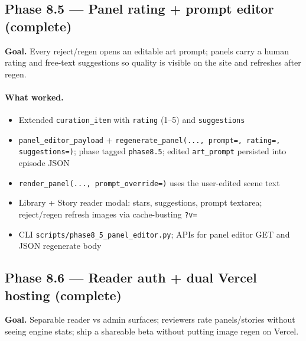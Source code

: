 \documentclass[10pt,twocolumn,letterpaper]{article}
\begin{document}
\subsection{Phase 8.5 --- Panel rating + prompt editor (complete)}
\textbf{Goal.} Every reject/regen opens an editable art prompt; panels carry a human rating and free-text suggestions so quality is visible on the site and refreshes after regen.

\paragraph{What worked.}
\begin{itemize}[leftmargin=*,itemsep=1pt]
  \item Extended \texttt{curation\_item} with \texttt{rating} (1--5) and \texttt{suggestions}
  \item \texttt{panel\_editor\_payload} + \texttt{regenerate\_panel(..., prompt=, rating=, suggestions=)}; phase tagged \texttt{phase8.5}; edited \texttt{art\_prompt} persisted into episode JSON
  \item \texttt{render\_panel(..., prompt\_override=)} uses the user-edited scene text
  \item Library + Story reader modal: stars, suggestions, prompt textarea; reject/regen refresh images via cache-busting \texttt{?v=}
  \item CLI \texttt{scripts/phase8\_5\_panel\_editor.py}; APIs for panel editor GET and JSON regenerate body
\end{itemize}

\subsection{Phase 8.6 --- Reader auth + dual Vercel hosting (complete)}
\textbf{Goal.} Separable reader vs admin surfaces; reviewers rate panels/stories without seeing engine stats; ship a shareable beta without putting image regen on Vercel.
\end{document}
